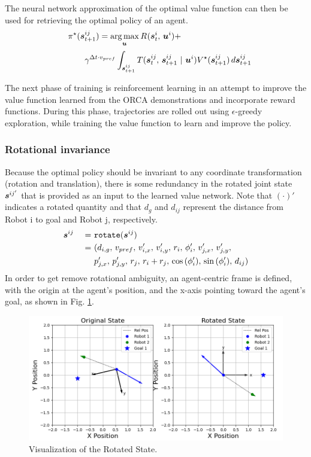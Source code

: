 \documentclass[conference]{IEEEtran}
\begin{document}
The neural network approximation of the optimal value function can then be used for retrieving the optimal policy of an agent.
\begin{alignat}{3}
    &&&\policy{}^{\star}(\state{ij}{t+1})=\argmax\limits_{\ctrl{}{}} \Reward{}(\state{i}{t}, \, \ctrl{i}{}) + \label{eqn:lookahead}\\
    &&&\qquad\gamma^{\dt \cdot \vel{pref}} \int_{\state{ij}{t+1}} \transition{\state{ij}{t}}{\state{ij}{t+1}}{\ctrl{i}{}} \Value(\state{ij}{t+1}) \, d\state{ij}{t+1}\nonumber
\end{alignat}

The next phase of training is reinforcement learning in an attempt to improve the value function learned from the ORCA demonstrations and incorporate reward functions. During this phase, trajectories are rolled out using $\epsilon$-greedy exploration, while training the value function to learn and improve the policy. 

\subsubsection{Rotational invariance}
\noindent Because the optimal policy should be invariant to any coordinate transformation (rotation and translation), there is some redundancy in the rotated joint state $\boldsymbol{s}^{ij'}_{}$ that is provided as an input to the learned value network. Note that $(\cdot)'$ indicates a rotated quantity and that $d_g$ and $d_{ij}$ represent the distance from Robot i to goal and Robot j, respectively.
\begin{alignat}{3}
    &\boldsymbol{s}^{ij}_{} & \ = \ &\texttt{rotate}(\boldsymbol{s}^{ij}_{})\\
    && \ = \ & (d_{i,g}, \, v_{pref}, \, v_{i,x}', \, v_{i,y}', \, r_i, \, \phi_{i}', \, v_{j,x}', \, v_{j,y}', \nonumber \\
    && \ & p_{j,x}', \, p_{j,y}', \, r_j, \, r_i + r_j, \, \cos{(\phi_{i}')}, \, \sin{(\phi_{i}')}, \, d_{ij} ) \nonumber
\end{alignat}
In order to get remove rotational ambiguity, an agent-centric frame is defined, with the origin at the agent’s position, and the x-axis pointing toward the agent’s goal, as shown in Fig. \ref{fig:rot_state}.
\begin{figure}[h!]
    \centering
    \includegraphics[width=\linewidth]{docs/latex/figures/rotated_state.png}
    \caption{Visualization of the Rotated State.}
    \label{fig:rot_state}
\end{figure}
\end{document}
